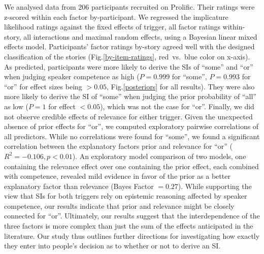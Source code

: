 \documentclass[11pt,letterpaper]{article}
\begin{document}
We analysed data from 206 participants recruited on Prolific. Their ratings were z-scored within each factor by-participant. 
We regressed the implicature likelihood ratings against the fixed effects of trigger, all factor ratings within-story, all interactions and maximal  random effects, using a Bayesian linear mixed effects model. 
Participants' factor ratings by-story agreed well with the designed classification of the stories (Fig.\ref{by-item-ratings}, red~vs.~blue color on x-axis).
As predicted, participants were more likely to derive the SIs of ``some'' and ``or'' when judging speaker competence as high ($P=0.999$ for ``some'',  $P=0.993$ for ``or'' for effect sizes being $>0.05$, Fig.\ref{posteriors} for all results). 
They were also more likely to derive the SI of ``some'' when judging the prior probability of ``all'' as low ($P= 1$ for effect $<0.05$), which was not the case for ``or''. %
Finally, we did not observe credible effects of relevance for either trigger.
Given the unexpected absence of prior effects for ``or'', we computed exploratory pairwise correlations of all predictors. While no correlations were found for ``some'', we found a significant correlation between the explanatory factors prior and relevance for ``or'' ($R^2=-0.106, p<0.01$). %
An exploratory model comparison of two models, one containing the relevance effect over one containing the prior effect, each combined with competence, revealed mild evidence in favor of the prior as a better explanatory factor than relevance (Bayes Factor $ = 0.27$). %
While supporting the view that SIs for both triggers rely on epistemic reasoning affected by speaker competence, our results indicate that prior and relevance might be closely connected for ``or''.
Ultimately, our results suggest that the interdependence of the three factors is more complex than just the sum of the effects anticipated in the literature. 
Our study thus outlines further directions for investigating how exactly they enter into people’s decision as to whether or not to derive an SI.
\end{document}
